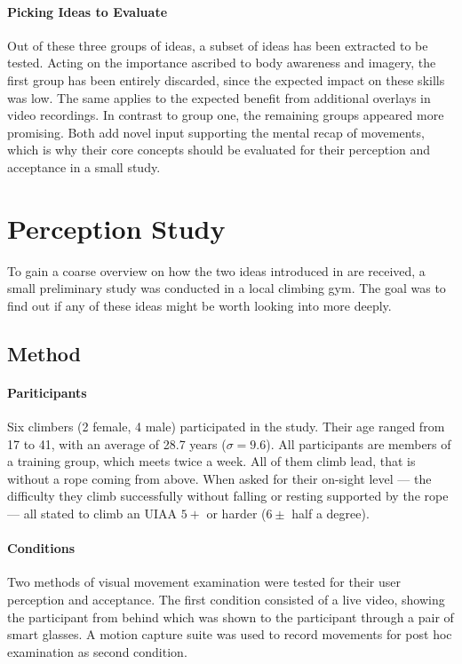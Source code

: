 \paragraph{Picking Ideas to Evaluate}

Out of these three groups of ideas, a subset of ideas has been extracted to be tested. Acting on the importance ascribed to body awareness and imagery, the first group has been entirely discarded, since the expected impact on these skills was low. The same applies to  the expected benefit from additional overlays in video recordings. In contrast to group one, the remaining groups appeared more promising. Both add novel input supporting the mental recap of movements, which is why their core concepts should be evaluated for  their perception and acceptance in a small study.

\section{Perception Study}

To gain a coarse overview on how the two ideas introduced in  are received, a small preliminary study was conducted in a local climbing gym. The goal was to find out if any of these ideas might be worth looking into more deeply.

\subsection{Method}
\paragraph{Pariticipants}

Six climbers (2 female, 4 male) participated in the study. Their age ranged from 17 to 41, with an average of  28.7 years ($\sigma = 9.6$). All participants are members of a training group, which meets twice a week. All of them climb lead, that is without a rope coming from above. When asked for their on-sight level --- the difficulty they climb successfully without falling or resting supported by the rope --- all stated to climb an UIAA $5+$ or harder ($6 \pm$ half a degree).
\paragraph{Conditions}

Two methods of visual movement examination were tested for their user perception and acceptance. The first condition consisted of a live video, showing the participant from behind which was shown to the participant through a pair of smart glasses. A motion capture suite was used to record movements for post hoc examination as second condition. 
